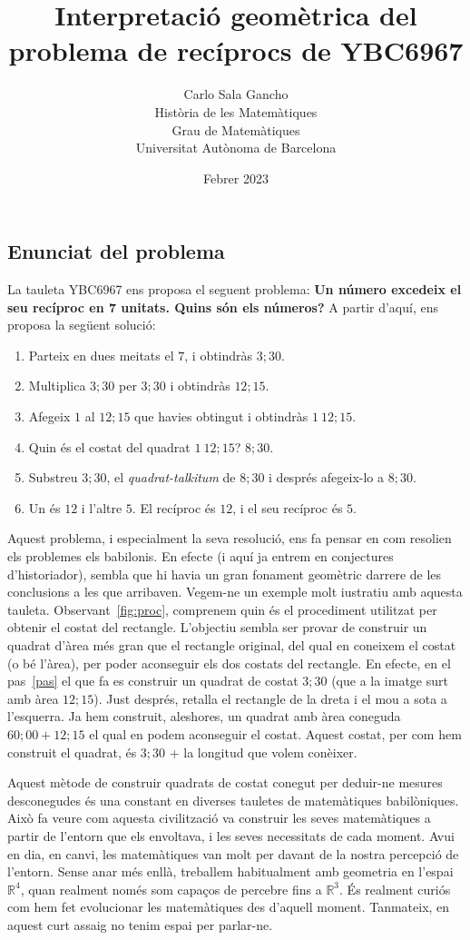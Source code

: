 \documentclass[a4paper, 11pt]{article}
\title{Interpretació geomètrica del problema de recíprocs de YBC6967}
\author{
  Carlo Sala Gancho\\
  Història de les Matemàtiques\\
  Grau de Matemàtiques\\
  Universitat Autònoma de Barcelona } \date{Febrer 2023}
\begin{document}
\maketitle
\subsection*{Enunciat del problema}
La tauleta YBC6967 ens proposa el seguent problema: \textbf{Un número excedeix el seu recíproc en 7 unitats. Quins són
  els números?} A partir d'aquí, ens proposa la següent solució:
\begin{enumerate}
  \item Parteix en dues meitats el $7$, i obtindràs $3;30$.
  \item Multiplica $3;30$ per $3;30$ i obtindràs $12;15$.\label{pas}
  \item Afegeix $1$ al $12;15$ que havies obtingut i obtindràs $1\ 12;15$.
  \item Quin és el costat del quadrat $1\ 12;15$? $8;30$.
  \item Substreu $3;30$, el \textit{quadrat-talkitum} de $8;30$ i després afegeix-lo a $8;30$.
  \item Un és $12$ i l'altre $5$. El recíproc és $12$, i el seu recíproc és $5$.
\end{enumerate}

Aquest problema, i especialment la seva resolució, ens fa pensar en com resolien els problemes els babilonis. En efecte
(i aquí ja entrem en conjectures d'historiador), sembla que hi havia un gran fonament geomètric darrere de les
conclusions a les que arribaven. Vegem-ne un exemple molt i\lgem{}ustratiu amb aquesta tauleta.
Observant~\ref{fig:proc}, comprenem quin és el procediment utilitzat per obtenir el costat del rectangle. L'objectiu
sembla ser provar de construir un quadrat d'àrea més gran que el rectangle original, del qual en coneixem el costat (o
bé l'àrea), per poder aconseguir els dos costats del rectangle. En efecte, en el pas~\ref{pas} el que fa es construir
un quadrat de costat $3;30$ (que a la imatge surt amb àrea $12;15$). Just després, retalla el rectangle de la dreta i
el mou a sota a l'esquerra. Ja hem construit, aleshores, un quadrat amb àrea coneguda $60;00 + 12;15$ el qual en podem
aconseguir el costat. Aquest costat, per com hem construit el quadrat, és $3;30$ + la longitud que volem conèixer.

Aquest mètode de construir quadrats de costat conegut per deduir-ne mesures desconegudes és una constant en diverses
tauletes de matemàtiques babilòniques. Això fa veure com aquesta civilització va construir les seves matemàtiques a
partir de l'entorn que els envoltava, i les seves necessitats de cada moment. Avui en dia, en canvi, les matemàtiques
van molt per davant de la nostra percepció de l'entorn. Sense anar més enllà, treballem habitualment amb geometria en
l'espai $\mathbb{R}^4$, quan realment només som capaços de percebre fins a $\mathbb{R}^3$. És realment curiós com hem
fet evolucionar les matemàtiques des d'aquell moment. Tanmateix, en aquest curt assaig no tenim espai per parlar-ne.
\end{document}
